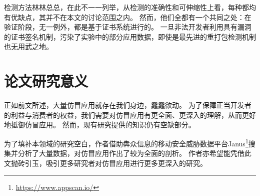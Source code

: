 检测方法林林总总，在此不一一列举，从检测的准确性和可伸缩性上看，每种都均有优缺点，其并不在本文的讨论范围之内。
然而，他们全都有一个共同之处：在验证阶段，无一例外，都是基于证书系统进行的。
一旦非法开发者利用具有漏洞的证书签名机制，污染了实验中的部分应用数据，即使是最先进的重打包检测机制也无用武之地。

\section{论文研究意义}

正如前文所述，大量仿冒应用就存在我们身边，蠢蠢欲动。
为了保障正当开发者的利益与消费者的权益，我们需要对仿冒应用有更全面、更深入的理解，从而更好地抵御仿冒应用。
然而，现有研究提供的知识仍有空缺部分。

为了填补本领域的研究空白，作者借助犇众信息的移动安全威胁数据平台Janus\footnote{\url{https://www.appscan.io/}}搜集并分析了大量数据，对仿冒应用作出了较为全面的剖析。
作者亦希望能凭借此文抛砖引玉，吸引更多研究者对仿冒应用进行更多更深入的研究。


